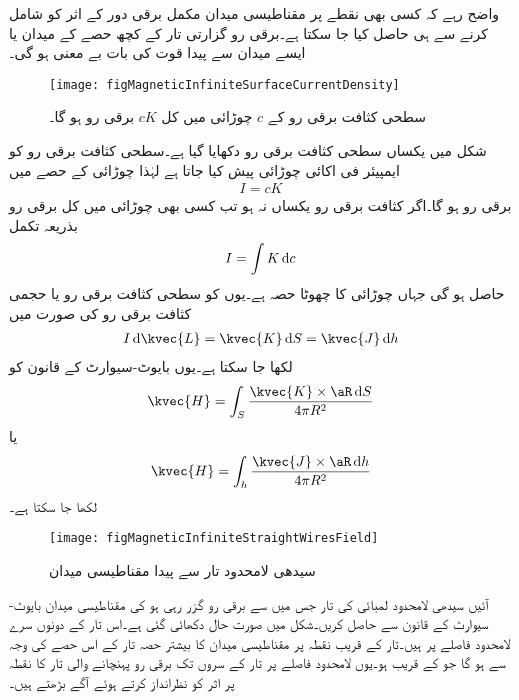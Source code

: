 واضح رہے کہ کسی بھی نقطے پر مقناطیسی میدان مکمل برقی دور کے اثر کو شامل کرنے سے ہی حاصل کیا جا سکتا ہے۔برقی رو گزارتی تار کے کچھ حصے کے میدان یا ایسے میدان سے پیدا قوت کی بات بے معنی ہو گی۔

\begin{figure}
\centering
\texttt{[image: figMagneticInfiniteSurfaceCurrentDensity]}
\caption{سطحی کثافت برقی رو کے $c$ چوڑائی میں کل $cK$ برقی رو ہو گا۔}
\label{شکل_مقناطیسی_سطحی_کثافت_برقی_رو_اور_رو}
\end{figure}

شکل  میں یکساں سطحی کثافت برقی رو  دکھایا گیا ہے۔سطحی کثافت برقی رو کو ایمپیئر فی اکائی چوڑائی پیش کیا جاتا ہے لہٰذا  چوڑائی کے حصے میں
\begin{align*}
I=cK
\end{align*}
 برقی رو ہو گا۔اگر کثافت برقی رو یکساں نہ ہو تب کسی بھی چوڑائی میں کل برقی رو بذریعہ تکمل
\begin{align*}
I=\int K \dif c
\end{align*}
حاصل ہو گی جہاں  چوڑائی کا چھوٹا حصہ ہے۔یوں  کو سطحی کثافت برقی رو  یا حجمی کثافت برقی رو  کی صورت میں
\begin{align}\label{مساوات-مقناطیسی_تفرقی_برقی_رو_مختلف_صورت}
I \dif \kvec{L}=\kvec{K} \dif S=\kvec{J} \dif h
\end{align}
لکھا جا سکتا ہے۔یوں بایوٹ-سیوارٹ کے قانون کو
\begin{align}
\kvec{H}=\int_S \frac{\kvec{K} \times \aR \dif S}{4\pi R^2}
\end{align}
یا
\begin{align}
\kvec{H}=\int_h \frac{\kvec{J} \times \aR \dif h}{4\pi R^2}
\end{align}
لکھا جا سکتا ہے۔

\begin{figure}
\centering
\texttt{[image: figMagneticInfiniteStraightWiresField]}
\caption{سیدھی لامحدود تار سے پیدا مقناطیسی میدان}
\label{شکل_مقناطیسی_سیدھی_لامحدود_تار_کا_میدان}
\end{figure}
آئیں  سیدھی  لامحدود لمبائی کی تار جس میں سے برقی رو گزر رہی ہو کی مقناطیسی میدان بایوٹ-سیوارٹ کے قانون سے حاصل کریں۔شکل  میں صورت حال دکھائی گئی ہے۔اس تار کے دونوں سرے لامحدود فاصلے پر ہیں۔تار کے قریب نقطہ  پر مقناطیسی میدان کا بیشتر حصہ تار کے اس حصے کی وجہ سے ہو گا جو  کے قریب ہو۔یوں لامحدود فاصلے پر تار کے سروں تک برقی رو پہنچانے  والی تار کا نقطہ  پر اثر کو نظرانداز کرتے ہوئے آگے بڑھتے ہیں۔ 

